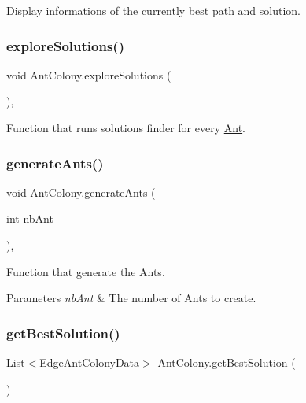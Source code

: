 Display informations of the currently best path and solution. 

\mbox{\label{classAntColony_ab60f421de9a669f4530175c92ecf07fe}} 
\subsubsection{\texorpdfstring{explore\+Solutions()}{exploreSolutions()}}
{\footnotesize\ttfamily void Ant\+Colony.\+explore\+Solutions (\begin{DoxyParamCaption}{ }\end{DoxyParamCaption})\hspace{0.3cm}{\ttfamily [inline]}, {\ttfamily [private]}}



Function that runs solutions finder for every \hyperlink{classAnt}{Ant}. 

\mbox{\label{classAntColony_a8e9a1c034219714ae24303e37f808af1}} 
\subsubsection{\texorpdfstring{generate\+Ants()}{generateAnts()}}
{\footnotesize\ttfamily void Ant\+Colony.\+generate\+Ants (\begin{DoxyParamCaption}\item[{int}]{nb\+Ant }\end{DoxyParamCaption})\hspace{0.3cm}{\ttfamily [inline]}, {\ttfamily [private]}}



Function that generate the Ants. 


\begin{DoxyParams}{Parameters}
{\em nb\+Ant} & The number of Ants to create.\\
\hline
\end{DoxyParams}
\mbox{\label{classAntColony_a695a3b069186ee619e405a684304afcf}} 
\subsubsection{\texorpdfstring{get\+Best\+Solution()}{getBestSolution()}}
{\footnotesize\ttfamily List$<$\hyperlink{classEdgeAntColonyData}{Edge\+Ant\+Colony\+Data}$>$ Ant\+Colony.\+get\+Best\+Solution (\begin{DoxyParamCaption}{ }\end{DoxyParamCaption})\hspace{0.3cm}{\ttfamily [inline]}}



